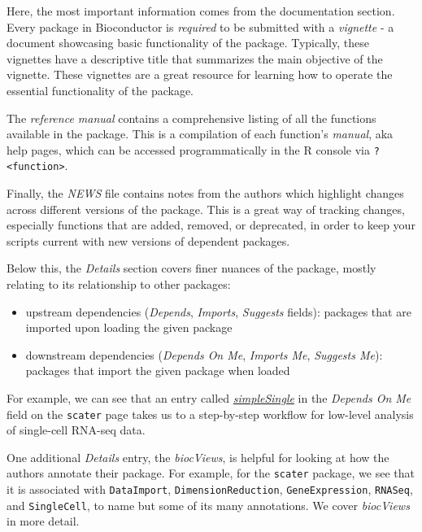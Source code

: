 \documentclass[]{book}
\providecommand{\tightlist}{%
  \setlength{\itemsep}{0pt}\setlength{\parskip}{0pt}}
\begin{document}
Here, the most important information comes from the documentation section. Every package in Bioconductor is \emph{required} to be submitted with a \emph{vignette} - a document showcasing basic functionality of the package. Typically, these vignettes have a descriptive title that summarizes the main objective of the vignette. These vignettes are a great resource for learning how to operate the essential functionality of the package.

The \emph{reference manual} contains a comprehensive listing of all the functions available in the package. This is a compilation of each function's \emph{manual}, aka help pages, which can be accessed programmatically in the R console via \texttt{?\textless{}function\textgreater{}}.

Finally, the \emph{NEWS} file contains notes from the authors which highlight changes across different versions of the package. This is a great way of tracking changes, especially functions that are added, removed, or deprecated, in order to keep your scripts current with new versions of dependent packages.

Below this, the \emph{Details} section covers finer nuances of the package, mostly relating to its relationship to other packages:

\begin{itemize}
\tightlist
\item
  upstream dependencies (\emph{Depends}, \emph{Imports}, \emph{Suggests} fields): packages that are imported upon loading the given package
\item
  downstream dependencies (\emph{Depends On Me}, \emph{Imports Me}, \emph{Suggests Me}): packages that import the given package when loaded
\end{itemize}

For example, we can see that an entry called \href{https://bioconductor.org/packages/release/workflows/html/simpleSingleCell.html}{\emph{simpleSingle}} in the \emph{Depends On Me} field on the \texttt{scater} page takes us to a step-by-step workflow for low-level analysis of single-cell RNA-seq data.

One additional \emph{Details} entry, the \emph{biocViews}, is helpful for looking at how the authors annotate their package. For example, for the \texttt{scater} package, we see that it is associated with \texttt{DataImport}, \texttt{DimensionReduction}, \texttt{GeneExpression}, \texttt{RNASeq}, and \texttt{SingleCell}, to name but some of its many annotations. We cover \emph{biocViews} in more detail.
\end{document}
